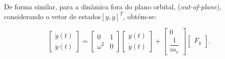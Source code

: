 De forma similar, para a dinâmica fora do plano orbital, (\textit{out-of-plane}), considerando o vetor de estados$[y,\dot{y}]^T$, obtém-se:

\begin{equation}
\begin{bmatrix}
\dot{y}(t) \\[4pt]
\ddot{y}(t)
\end{bmatrix}
=
\begin{bmatrix}
0 & 1 \\[4pt]
\omega^{2} & 0
\end{bmatrix}
\begin{bmatrix}
y(t) \\[4pt]
\dot{y}(t)
\end{bmatrix}
+
\begin{bmatrix}
0 \\[4pt]
\dfrac{1}{m_c}
\end{bmatrix}
\begin{bmatrix}
F_y
\end{bmatrix}.
\end{equation}
